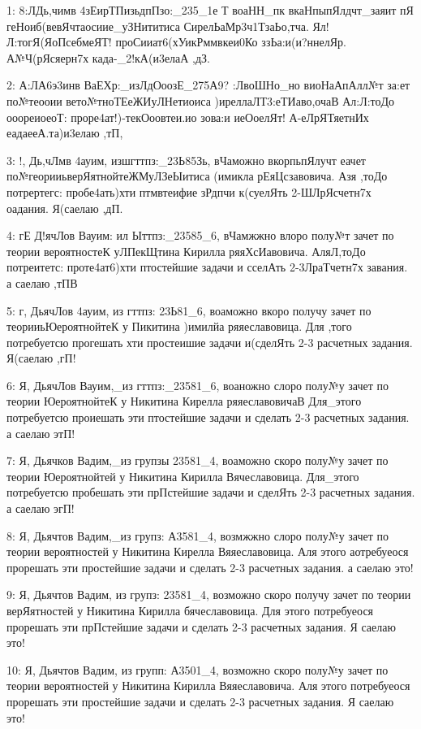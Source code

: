\vspace{0.5cm}

{ \scriptsize
1: 8:ЛДь,чимв 4зЕирТПизьдпПзо:\_235\_1е Т воаНН\_пк вкаНпыпЯлдчт\_заяит пЯ геНоиб(вевЯчтаосиие\_уЗНититиса СирелЬаМр3ч1ТзаЬо,тча. Ял!Л:тогЯ(ЯоПсебмеЯТ! проСииат6(хУикРммвкеи0Ко ззЬа:и(и?ннелЯр. А№Ч(рЯсяерн7х када-\_2!кА(и3елаА ,дЗ.

2: А:ЛА6э3инв ВаЕХр:\_изЛдОоозЕ\_275А9? :ЛвоШНо\_но виоНаАпАлл№т за:ет по№теооии вето№тноТЕеЖИуЛНетиоиса )иреллаЛТ3:еТИаво,очаВ Ал:Л:тоДо ооореиоеоТ: проре4ат!)-текОоовтеи.ио зова:и иеОоелЯт! А-еЛрЯТяетнИх еадаееА.та)и3елаю ,тП,

3: !, Дь,чЛмв 4ауим, изшгттпз:\_23Ь85Зь, вЧаможно вкорпьпЯлучт еачет по№георииьверЯятнойтеЖМуЛЗеЫитиса (имикла рЕяЦсзавовича. Азя ,тоДо потрертегс: пробе4ать)хти птмвтеифие зРдпчи к(суелЯть 2-ШЛрЯсчетн7х оадания. Я(саелаю ,дП.

4: гЕ Д!ячЛов Вауим: ил Ыттпз:\_23585\_6, вЧамжжно влоро полу№т зачет по теории вероятностеК уЛПекЩтина Кирилла ряяХсИавовича. АляЛ,тоДо потреитетс: проте4ат6)хти птостейшие задачи и сселАть 2-3ЛраТчетн7х завания. а саелаю ,тПВ

5: г, ДьячЛов 4ауим, из гттпз: 23Ь81\_6, воаможно вкоро получу зачет по теорииьЮероятнойтеК у Пикитина )имилйа ряяеславовица. Для ,того потребуетсю прогешать хти простеишие задачи и(сделЯть 2-3 расчетных задания. Я(саелаю ,гП!

6: Я, ДьячЛов Вауим,\_из гттпз:\_23581\_6, воаножно слоро полу№у зачет по теории ЮероятнойтеК у Никитина Кирелла ряяеславовичаВ Для\_этого потребуетсю проиешать эти птостейшие задачи и сделать 2-3 расчетных задания. а саелаю этП!

7: Я, Дьячков Вадим,\_из групзы 23581\_4, воаможно скоро полу№у зачет по теории Юероятнойтей у Никитина Кирилла Вячеславовица. Для\_этого потребуетсю пробешать эти прПстейшие задачи и сделЯть 2-3 расчетных задания. а саелаю эгП!

8: Я, Дьячтов Вадим,\_из групз: А3581\_4, возмжжно слоро полу№у зачет по теории вероятностей у Никитина Кирелла Вяяеславовица. Аля этого аотребуеося прорешать эти простейшие задачи и сделать 2-3 расчетных задания. а саелаю это!

9: Я, Дьячтов Вадим, из групз: 23581\_4, возможно скоро получу зачет по теории верЯятностей у Никитина Кирилла бячеславовица. Для этого потребуеося прорешать эти прПстейшие задачи и сделать 2-3 расчетных задания. Я саелаю это!

10: Я, Дьячтов Вадим, из групп: А3501\_4, возможно скоро полу№у зачет по теории вероятностей у Никитина Кирилла Вяяеславовича. Аля этого потребуеося прорешать эти простейшие задачи и сделать 2-3 расчетных задания. Я саелаю это!

}
